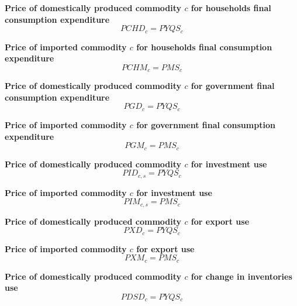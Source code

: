 \documentclass[12pt]{article}
\numberwithin{equation}{section}
\begin{document}
\noindent\textbf{Price of domestically produced commodity $c$ for households final consumption expenditure} \\
\begin{dmath}
PCHD_{c} = PYQS_{c}
\end{dmath}

\noindent\textbf{Price of imported commodity $c$ for households final consumption expenditure} \\
\begin{dmath}
PCHM_{c} = PMS_{c}
\end{dmath}

\noindent\textbf{Price of domestically produced commodity $c$ for government final consumption expenditure} \\
\begin{dmath}
PGD_{c} = PYQS_{c}
\end{dmath}

\noindent\textbf{Price of imported commodity $c$ for government final consumption expenditure} \\
\begin{dmath}
PGM_{c} = PMS_{c}
\end{dmath}

\noindent\textbf{Price of domestically produced commodity $c$ for investment use} \\
\begin{dmath}
PID_{c, s} = PYQS_{c}
\end{dmath}

\noindent\textbf{Price of imported commodity $c$ for investment use} \\
\begin{dmath}
PIM_{c, s} = PMS_{c}
\end{dmath}

\noindent\textbf{Price of domestically produced commodity $c$ for export use} \\
\begin{dmath}
PXD_{c} = PYQS_{c}
\end{dmath}

\noindent\textbf{Price of imported commodity $c$ for export use} \\
\begin{dmath}
PXM_{c} = PMS_{c}
\end{dmath}

\noindent\textbf{Price of domestically produced commodity $c$ for change in inventories use} \\
\begin{dmath}
PDSD_{c} = PYQS_{c}
\end{dmath}
\end{document}
